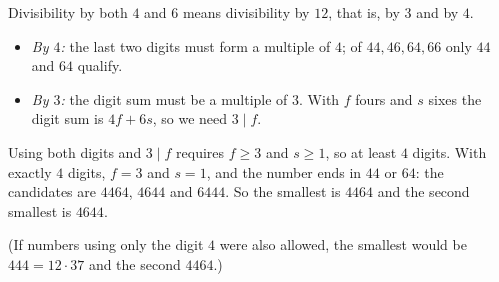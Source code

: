 Divisibility by both $4$ and $6$ means divisibility by $12$, that is, by $3$ and by $4$.
\begin{itemize}
\item \emph{By $4$:} the last two digits must form a multiple of $4$; of $44,46,64,66$ only $44$ and $64$ qualify.
\item \emph{By $3$:} the digit sum must be a multiple of $3$. With $f$ fours and $s$ sixes the digit sum is $4f+6s$, so we need $3\mid f$.
\end{itemize}
Using both digits and $3\mid f$ requires $f\ge3$ and $s\ge1$, so at least $4$ digits. With exactly $4$ digits, $f=3$ and $s=1$, and the number ends in $44$ or $64$: the candidates are $4464$, $4644$ and $6444$. So the smallest is $\boxed{4464}$ and the second smallest is $\boxed{4644}$.

(If numbers using only the digit $4$ were also allowed, the smallest would be $444=12\cdot37$ and the second $4464$.)
